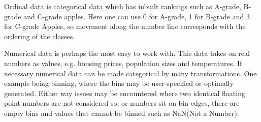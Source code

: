 Ordinal data is categorical data which has inbuilt rankings such as A-grade, B-grade and C-grade apples.
Here one can use 0 for A-grade, 1 for B-grade and 3 for C-grade Apples, so movement along the number line corresponds with the ordering of the classes.

Numerical data is perhaps the most easy to work with.
This data takes on real numbers as values, e.g. housing prices, population sizes and temperatures.
If necessary numerical data can be made categorical by many transformations.
One example being binning, where the bins may be user-specified or optimally generated.
Either way issues may be encountered where two identical floating point numbers are not considered so, or numbers sit on bin edges, there are empty bins and values that cannot be binned such as NaN(Not a Number).


%


